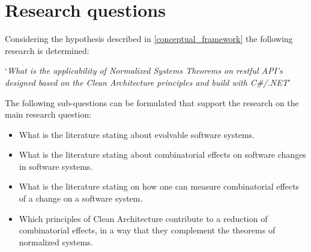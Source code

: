 \section{Research questions} \label{research_questions}
Considering the hypothesis described in \ref{conceptual_framework} the following research
is determined:

\begin{center}
    \enquote*{\textit{What is the applicability of Normalized Systems Theorems
    on restful API's designed based on the Clean Architecture principles and build with
    C\#/.NET}}
\end{center}

The following sub-questions can be formulated that support the research on the main
research question:
\begin{itemize}
    \item What is the literature stating about evolvable software systems.
    \item What is the literature stating about combinatorial effects on software changes in software systems.
    \item What is the literature stating on how one can measure combinatorial effects of a change on a software system.
    \item Which principles of Clean Architecture contribute to a reduction of
    combinatorial effects, in a way that they complement the theorems of normalized
    systems.
\end{itemize}